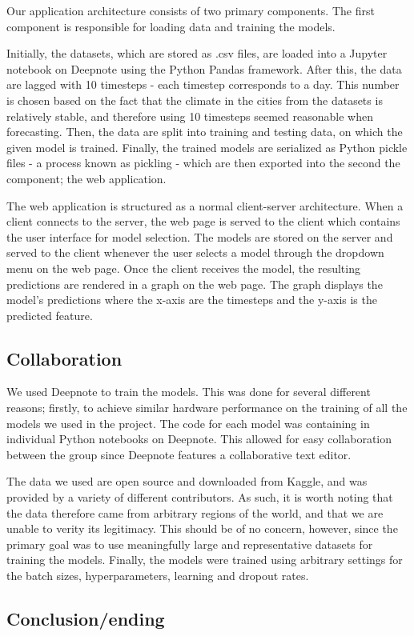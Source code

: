 Our application architecture consists of two primary components.
The first component is responsible for loading data and training the models.

Initially, the datasets, which are stored as .csv files, are loaded into a Jupyter notebook on Deepnote using the Python Pandas framework.
After this, the data are lagged with 10 timesteps - each timestep corresponds to a day.
This number is chosen based on the fact that the climate in the cities from the datasets is relatively stable, and therefore using 10 timesteps seemed reasonable when forecasting.
Then, the data are split into training and testing data, on which the given model is trained. 
Finally, the trained models are serialized as Python pickle files - a process known as pickling - which are then exported into the second the component; the web application.

The web application is structured as a normal client-server architecture.
When a client connects to the server, the web page is served to the client which contains the user interface for model selection.
The models are stored on the server and served to the client whenever the user selects a model through the dropdown menu on the web page.
Once the client receives the model, the resulting predictions are rendered in a graph on the web page.
The graph displays the model's predictions where the x-axis are the timesteps and the y-axis is the predicted feature.


\subsection{Collaboration}
We used Deepnote\cite{deepnote} to train the models. 
This was done for several different reasons; firstly, to achieve similar hardware performance on the training of all the models we used in the project.
The code for each model was containing in individual Python notebooks on Deepnote.
This allowed for easy collaboration between the group since Deepnote features a collaborative text editor.

The data we used are open source and downloaded from Kaggle\cite{kaggle}, and was provided by a variety of different contributors.
As such, it is worth noting that the data therefore came from arbitrary regions of the world, and that we are unable to verity its legitimacy.
This should be of no concern, however, since the primary goal was to use meaningfully large and representative datasets for training the models.
Finally, the models were trained using arbitrary settings for the batch sizes, hyperparameters, learning and dropout rates.


\subsection{Conclusion/ending}
